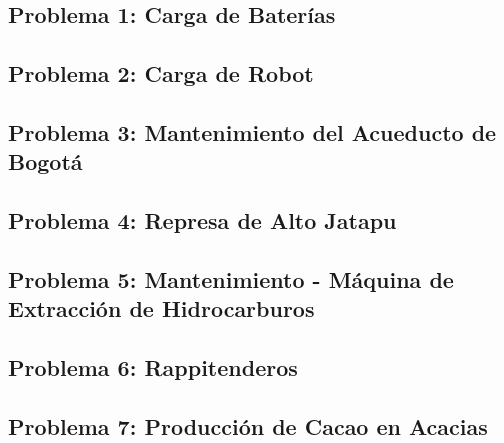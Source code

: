\documentclass[12pt]{article}
\begin{document}
\thispagestyle{fancy}

\subsection*{Problema 1: Carga de Baterías}


\subsection*{Problema 2: Carga de Robot}


\subsection*{Problema 3: Mantenimiento del Acueducto de Bogotá}


\subsection*{Problema 4: Represa de Alto Jatapu}


\subsection*{Problema 5: Mantenimiento - Máquina de Extracción de Hidrocarburos}


\subsection*{Problema 6: Rappitenderos}


\subsection*{Problema 7: Producción de Cacao en Acacias}

\end{document}
